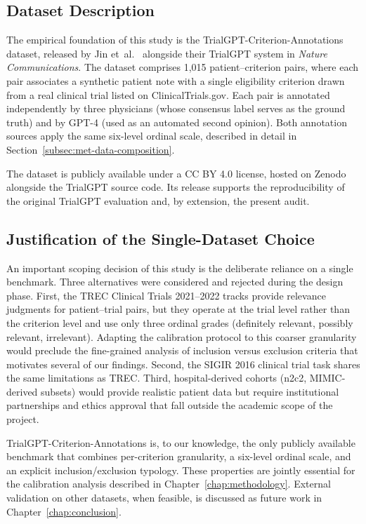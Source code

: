 \subsection{Dataset Description}
\label{subsec:ctx-desc}

The empirical foundation of this study is the 
TrialGPT-Criterion-Annotations dataset, released by Jin 
et~al.~\cite{jin2024trialgpt} alongside their TrialGPT system in 
\emph{Nature Communications}. The dataset comprises 1{,}015 
patient--criterion pairs, where each pair associates a synthetic 
patient note with a single eligibility criterion drawn from a real 
clinical trial listed on ClinicalTrials.gov. Each pair is annotated 
independently by three physicians (whose consensus label serves as 
the ground truth) and by GPT-4 (used as an automated second opinion). 
Both annotation sources apply the same six-level ordinal scale, 
described in detail in Section~\ref{subsec:met-data-composition}.

The dataset is publicly available under a CC BY 4.0 license, hosted on 
Zenodo alongside the TrialGPT source code. Its release supports the 
reproducibility of the original TrialGPT evaluation and, by extension, 
the present audit.

\subsection{Justification of the Single-Dataset Choice}
\label{subsec:ctx-single}

An important scoping decision of this study is the deliberate reliance 
on a single benchmark. Three alternatives were considered and rejected 
during the design phase. First, the TREC Clinical Trials 2021--2022 
tracks provide relevance judgments for patient--trial pairs, but they 
operate at the trial level rather than the criterion level and use 
only three ordinal grades (definitely relevant, possibly relevant, 
irrelevant). Adapting the calibration protocol to this coarser 
granularity would preclude the fine-grained analysis of inclusion 
versus exclusion criteria that motivates several of our findings. 
Second, the SIGIR 2016 clinical trial task shares the same limitations 
as TREC. Third, hospital-derived cohorts (n2c2, MIMIC-derived 
subsets) would provide realistic patient data but require 
institutional partnerships and ethics approval that fall outside the 
academic scope of the project.

TrialGPT-Criterion-Annotations is, to our knowledge, the only publicly 
available benchmark that combines per-criterion granularity, a 
six-level ordinal scale, and an explicit inclusion/exclusion typology. 
These properties are jointly essential for the calibration analysis 
described in Chapter~\ref{chap:methodology}. External validation on 
other datasets, when feasible, is discussed as future work in 
Chapter~\ref{chap:conclusion}.

